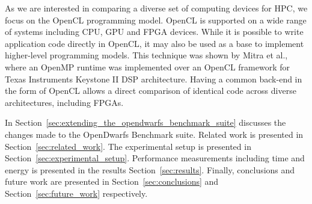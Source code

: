 \documentclass[../document.tex]{subfiles}
\begin{document}
As we are interested in comparing a diverse set of computing devices for HPC, we focus on the OpenCL programming model.
OpenCL is supported on a wide range of systems including CPU, GPU and FPGA devices.
While it is possible to write application code directly in OpenCL, it may also be used as a base to implement higher-level programming models.
This technique was shown by Mitra et al.,~\cite{mitra2014implementation} where an OpenMP runtime was implemented over an OpenCL framework for Texas Instruments Keystone II DSP architecture.
Having a common back-end in the form of OpenCL allows a direct comparison of identical code across diverse architectures, including FPGAs.


In Section~\ref{sec:extending_the_opendwarfs_benchmark_suite} discusses the changes made to the OpenDwarfs Benchmark suite.
Related work is presented in Section~\ref{sec:related_work}.
The experimental setup is presented in Section~\ref{sec:experimental_setup}.
Performance measurements including time and energy is presented in the results Section~\ref{sec:results}.
Finally, conclusions and future work are presented in Section~\ref{sec:conclusions} and Section~\ref{sec:future_work} respectively.
\end{document}
